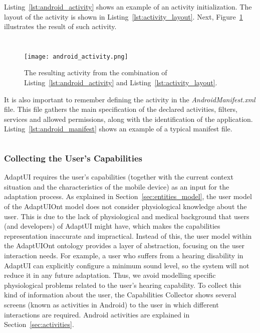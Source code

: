 Listing~\ref{lst:android_activity} shows an example of an activity initialization.
The layout of the activity is shown in Listing~\ref{lst:activity_layout}. Next,
Figure~\ref{fig:android_activity} illustrates the result of such activity.

\inputminted[linenos=true, fontsize=\footnotesize, frame=lines]{java}{4_system_architecture/android_activity.java}

\inputminted[linenos=true, fontsize=\footnotesize, frame=lines]{xml}{4_system_architecture/activity_layout.xml}

\begin{figure}
\centering
\texttt{[image: android\_activity.png]}
\caption{The resulting activity from the combination of Listing~\ref{lst:android_activity} and
Listing~\ref{lst:activity_layout}.}
\label{fig:android_activity}
\end{figure}

It is also important to remember defining the activity in the \textit{AndroidManifest.xml}
file. This file gathers the main specification of the declared activities, filters,
services and allowed permissions, along with the identification of the application.
Listing~\ref{lst:android_manifest} shows an example of a typical manifest file.

\inputminted[linenos=true, fontsize=\footnotesize, frame=lines]{xml}{4_system_architecture/android_manifest.xml}

\subsubsection{Collecting the User's Capabilities}
\label{sec:user_capabilities}

AdaptUI requires the user's capabilities (together with the current context
situation and the characteristics of the mobile device) as an input  for the
adaptation process. As explained in Section~\ref{sec:entities_model}, the user
model of the AdaptUIOnt model does not consider physiological knowledge about
the user. This is due to the lack of physiological and medical background that
users (and developers) of AdaptUI might have, which makes the capabilities
representation inaccurate and impractical. Instead of this, the user model
within the AdaptUIOnt ontology provides a layer of abstraction, focusing on the
user interaction needs. For example, a user who suffers from a hearing disability
in AdaptUI can explicitly configure a minimum sound level, so the system will
not reduce it in any future adaptation. Thus, we avoid modelling specific
physiological problems related to the user's hearing capability. To collect this
kind of information about the user, the Capabilities Collector shows several
screens (known as activities in Android) to the user in which different
interactions are required. Android activities are explained in Section~\ref{sec:activities}.

